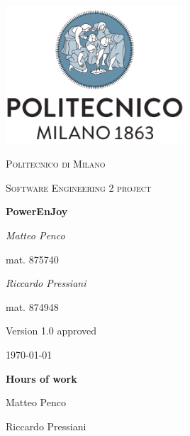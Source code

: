 \documentclass{report}
\begin{document}
\begin{titlepage}
	\centering
	\includegraphics[width=0.5\textwidth]{polimi-logo}\par\vspace{1cm}
	{\scshape\LARGE Politecnico di Milano\par}
	\vspace{1cm}
	{\scshape\Large Software Engineering 2 project\par}
	\vspace{1.5cm}
	{\huge\bfseries PowerEnJoy\par}
	\vspace{2cm}
	\begin{multicols}{2}
		{\Large\itshape Matteo Penco\par}
		\vspace{0.25cm}
		mat. 875740
		\vfill\columnbreak
		{\Large\itshape Riccardo Pressiani\par}
		\vspace{0.25cm}
		mat. 874948
	\end{multicols}
	
	\vfill
	
	{\Large Version 1.0 approved\par}
	\vspace{1.25cm}
	{\large \today\par}
\end{titlepage}

\begin{versionhistory}
\end{versionhistory}

\vspace{5cm}
{\noindent\Huge\bfseries Hours of work\par}
\vspace{0.5cm}
{\noindent Matteo Penco	\par}
{\noindent Riccardo Pressiani \par}

\tableofcontents





\begin{appendices}
	
	
\end{appendices}

\listoffigures
\begingroup
\let\clearpage\relax
\endgroup



\end{document}
